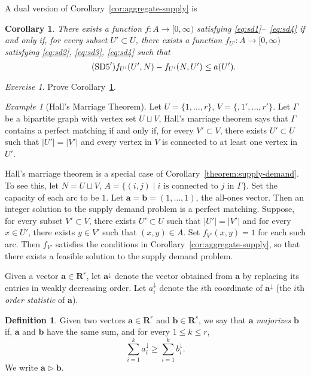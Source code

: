 \documentclass{amsbook}
\newcommand{\bb}{\mathbf b}
\renewcommand{\aa}{\mathbf a}
\newcommand{\RR}{\mathbf R}
\newtheorem{corollary}[theorem]{Corollary}
\theoremstyle{definition}
\newtheorem{definition}[theorem]{Definition}
\theoremstyle{remark}
\newtheorem{example}[theorem]{Example}
\newtheorem{exercise}[theorem]{Exercise}
\begin{document}
A dual version of Corollary~\ref{cor:aggregate-supply} is
\begin{corollary}
  \label{cor:aggregate-demand}
  There exists a function $f:A\to [0,\infty)$ satisfying \eqref{eq:sd1}--~\eqref{eq:sd4} if and only if, for every subset $U'\subset U$, there exists a function $f_{U'}:A\to [0,\infty)$ satisfying \eqref{eq:sd2}, \eqref{eq:sd3}, \eqref{eq:sd4} such that
  \begin{equation}
    \label{eq:U'}
    \tag{$\text{SD5}'$}
    f_{U'}(U',N)-f_{U'}(N,U')\leq a(U').
  \end{equation}
\end{corollary}
\begin{exercise}
  Prove Corollary~\ref{cor:aggregate-demand}.
\end{exercise}
\begin{example}
  [Hall's Marriage Theorem]
  Let $U=\{1,\dotsc,r\}$, $V=\{,1',\dotsc,r'\}$.
  Let $\Gamma$ be a bipartite graph with vertex set $U\sqcup V$,
  Hall's marriage theorem says that $\Gamma$ contains a perfect matching if and only if, for every $V'\subset V$, there exists $U'\subset U$ such that $|U'|=|V'|$ and every vertex in $V$ is connected to at least one vertex in $U'$.
  
  Hall's marriage theorem is a special case of Corollary~\ref{theorem:supply-demand}.
  To see this, let $N=U\sqcup V$, $A=\{(i,j)\mid \text{$i$ is connected to $j$ in $\Gamma$}\}$.
  Set the capacity of each arc to be $1$.
  Let $\aa=\bb=(1,\dotsc,1)$, the all-ones vector.
  Then an integer solution to the supply demand problem is a perfect matching.
  Suppose, for every subset $V'\subset V$, there exists $U'\subset U$ such that $|U'|= |V'|$ and for every $x\in U'$, there exists $y\in V'$ such that $(x,y)\in A$.
  Set $f_{V'}(x,y)=1$ for each such arc.
  Then $f_{V'}$ satisfies the conditions in Corollary~\ref{cor:aggregate-supply}, so that there exists a feasible solution to the supply demand problem.
\end{example}
Given a vector $\aa\in \RR^r$, let $\aa^\downarrow$ denote the vector obtained from $\aa$ by replacing its entries in weakly decreasing order.
Let $a^\downarrow_i$ denote the $i$th coordinate of $\aa^\downarrow$ (the $i$th \emph{order statistic} of $\aa$).
\begin{definition}
  \label{definition:majorization}
  Given two vectors $\aa\in \RR^r$ and $\bb\in \RR^s$, we say that $\aa$ \emph{majorizes} $\bb$ if, $\aa$ and $\bb$ have the same sum, and for every $1\leq k\leq r$,
  \begin{displaymath}
    \sum_{i=1}^k a^\downarrow_i \geq \sum_{i=1}^k b^\downarrow_i. 
  \end{displaymath}
  We write $\aa\rhd \bb$.
\end{definition}
\end{document}
